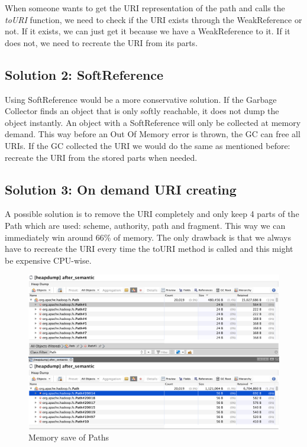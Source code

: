 When someone wants to get the URI representation of the path and calls the \textit{toURI} function, we need to check if the URI exists through the WeakReference or not. If it exists, we can just get it because we have a WeakReference to it. If it does not, we need to recreate the URI from its parts. 

\subsection{Solution 2: SoftReference}
Using SoftReference would be a more conservative solution. If the Garbage Collector finds an object that is only softly reachable, it does not dump the object instantly. An object with a SoftReference will only be collected at memory demand. This way before an Out Of Memory error is thrown, the GC can free all URIs. If the GC collected the URI we would do the same as mentioned before: recreate the URI from the stored parts when needed. 

\subsection{Solution 3: On demand URI creating}
A possible solution is to remove the URI completely and only keep 4 parts of the Path which are used: scheme, authority, path and fragment. This way we can immediately win around 66\% of memory. The only drawback is that we always have to recreate the URI every time the toURI method is called and this might be expensive CPU-wise.

\begin{figure}[H]
	\includegraphics[width=150mm, keepaspectratio]{figures/path_before_after.png}
	\centering
	\caption{Memory save of Paths}
\end{figure}

